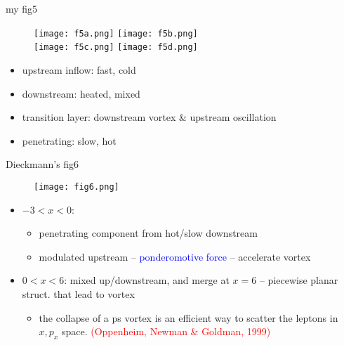 \documentclass[10pt]{beamer}
\begin{document}
\begin{frame}{my fig5}
  \begin{figure}
    \texttt{[image: f5a.png]}
    \texttt{[image: f5b.png]} \\
    \texttt{[image: f5c.png]}
    \texttt{[image: f5d.png]} \\
  \end{figure}
  
\begin{center}  
\begin{itemize}
  	\item upstream inflow: fast, cold
    \item downstream: heated, mixed
    \item transition layer: downstream vortex \& upstream oscillation
    \item penetrating: slow, hot
  \end{itemize}
\end{center}
\end{frame}

\begin{frame}{Dieckmann's fig6}

\begin{figure}
\texttt{[image: fig6.png]}
\end{figure}


\begin{center}  
\begin{itemize}
    \item \footnotesize $-3 < x < 0$:
    \begin{itemize}
    \item \footnotesize penetrating component from hot/slow downstream
    \item \footnotesize modulated upstream -- \textcolor{blue}{ponderomotive force} -- accelerate vortex
    \end{itemize}
    \item \footnotesize $0 < x < 6$: mixed up/downstream, and merge at $x=6$ -- piecewise planar struct. that lead to vortex
    \begin{itemize}
    \item \footnotesize the collapse of a ps vortex is an efficient way to scatter the leptons in $x,p_x$ space. \textcolor{red}{(Oppenheim, Newman \& Goldman, 1999)}
    \end{itemize}
  \end{itemize}
\end{center}
\end{frame}
\end{document}
